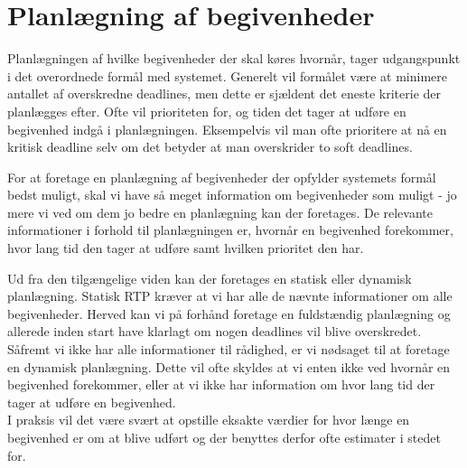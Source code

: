 \section{Planlægning af begivenheder}
Planlægningen af hvilke begivenheder der skal køres hvornår, tager udgangspunkt i det overordnede formål med systemet. Generelt vil formålet være at minimere antallet af overskredne deadlines, men dette er sjældent det eneste kriterie der planlægges efter. Ofte vil prioriteten for, og tiden det tager at udføre en begivenhed indgå i planlægningen. Eksempelvis vil man ofte prioritere at nå en kritisk deadline selv om det betyder at man overskrider to soft deadlines. 


For at foretage en planlægning af begivenheder der opfylder systemets formål bedst muligt, skal vi have så meget information om begivenheder som muligt - jo mere vi ved om dem jo bedre en planlægning kan der foretages. De relevante informationer i forhold til planlægningen er, hvornår en begivenhed forekommer, hvor lang tid den tager at udføre samt hvilken prioritet den har. 

Ud fra den tilgængelige viden kan der foretages en statisk eller dynamisk planlægning\cite{cheng1987scheduling}. Statisk RTP kræver at vi har alle de nævnte informationer om alle begivenheder. Herved kan vi på forhånd foretage en fuldstændig planlægning og allerede inden start have klarlagt om nogen deadlines vil blive overskredet. Såfremt vi ikke har alle informationer til rådighed, er vi nødsaget til at foretage en dynamisk planlægning. Dette vil ofte skyldes at vi enten ikke ved hvornår en begivenhed forekommer, eller at vi ikke har information om hvor lang tid der tager at udføre en begivenhed. \\
I praksis vil det være svært at opstille eksakte værdier for hvor længe en begivenhed er om at blive udført og der benyttes derfor ofte estimater i stedet for. 


